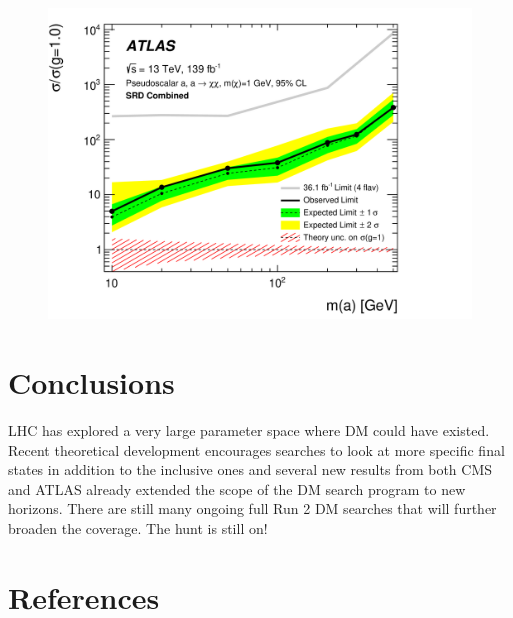\documentclass{moriond}
\begin{document}
\begin{figure} [htb]
\centerline{\includegraphics[width=0.5\linewidth]{DMBB}}
\caption[]{}
\label{fig:dmbb}
\end{figure}

\section{Conclusions}

LHC has explored a very large parameter space where DM could have existed.
Recent theoretical development encourages searches to look at more specific
final states in addition to the inclusive ones and several new results from
both CMS and ATLAS already extended the scope of the DM search program to new
horizons. There are still many ongoing full Run 2 DM searches that will further
broaden the coverage. The hunt is still on!

\section*{References}
\end{document}
